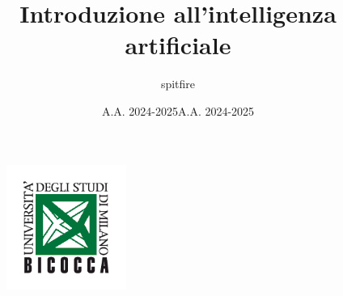 \documentclass[12pt]{article}
\title{Introduzione all'intelligenza artificiale}
\author{spitfire}
\date{A.A. 2024-2025}
\begin{document}
\begin{figure}
    \centering
    \includegraphics[width=0.35\textwidth]{Images/Logo scienze bicocca.png}
\end{figure}

\vspace{10cm}
\date{A.A. 2024-2025}


\maketitle

\newpage

\tableofcontents
\newpage
\end{document}
